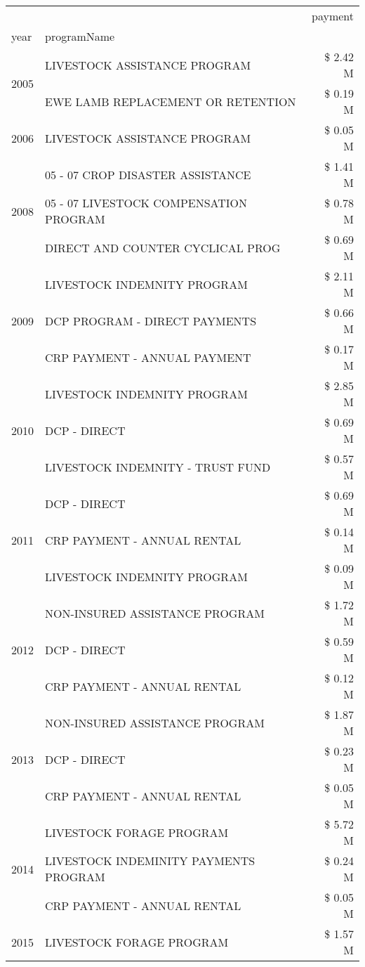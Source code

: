 \begin{tabular}{llr}
\toprule
 &  & payment \\
year & programName &  \\
\midrule
\multirow[t]{2}{*}{2005} & LIVESTOCK ASSISTANCE PROGRAM & \$ 2.42 M \\
 & EWE LAMB REPLACEMENT OR RETENTION & \$ 0.19 M \\
\cline{1-3}
2006 & LIVESTOCK ASSISTANCE PROGRAM & \$ 0.05 M \\
\cline{1-3}
\multirow[t]{3}{*}{2008} & 05 - 07 CROP DISASTER ASSISTANCE & \$ 1.41 M \\
 & 05 - 07 LIVESTOCK COMPENSATION PROGRAM & \$ 0.78 M \\
 & DIRECT AND COUNTER CYCLICAL PROG & \$ 0.69 M \\
\cline{1-3}
\multirow[t]{3}{*}{2009} & LIVESTOCK INDEMNITY PROGRAM & \$ 2.11 M \\
 & DCP PROGRAM - DIRECT PAYMENTS & \$ 0.66 M \\
 & CRP PAYMENT - ANNUAL PAYMENT & \$ 0.17 M \\
\cline{1-3}
\multirow[t]{3}{*}{2010} & LIVESTOCK INDEMNITY PROGRAM & \$ 2.85 M \\
 & DCP - DIRECT & \$ 0.69 M \\
 & LIVESTOCK INDEMNITY - TRUST FUND & \$ 0.57 M \\
\cline{1-3}
\multirow[t]{3}{*}{2011} & DCP - DIRECT & \$ 0.69 M \\
 & CRP PAYMENT - ANNUAL RENTAL & \$ 0.14 M \\
 & LIVESTOCK INDEMNITY PROGRAM & \$ 0.09 M \\
\cline{1-3}
\multirow[t]{3}{*}{2012} & NON-INSURED ASSISTANCE PROGRAM & \$ 1.72 M \\
 & DCP - DIRECT & \$ 0.59 M \\
 & CRP PAYMENT - ANNUAL RENTAL & \$ 0.12 M \\
\cline{1-3}
\multirow[t]{3}{*}{2013} & NON-INSURED ASSISTANCE PROGRAM & \$ 1.87 M \\
 & DCP - DIRECT & \$ 0.23 M \\
 & CRP PAYMENT - ANNUAL RENTAL & \$ 0.05 M \\
\cline{1-3}
\multirow[t]{3}{*}{2014} & LIVESTOCK FORAGE PROGRAM & \$ 5.72 M \\
 & LIVESTOCK INDEMINITY PAYMENTS PROGRAM & \$ 0.24 M \\
 & CRP PAYMENT - ANNUAL RENTAL & \$ 0.05 M \\
\cline{1-3}
\multirow[t]{3}{*}{2015} & LIVESTOCK FORAGE PROGRAM & \$ 1.57 M \\

\end{tabular}
